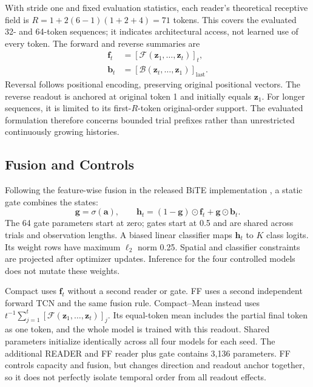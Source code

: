 \documentclass[conference]{IEEEtran}
\begin{document}
With stride one and fixed evaluation statistics, each reader's theoretical
receptive field is $R=1+2(6-1)(1+2+4)=71$ tokens. This covers the evaluated
32- and 64-token sequences; it indicates architectural access, not learned
use of every token. The forward and reverse summaries are
\begin{align}
\mathbf f_t&=[\mathcal F(\mathbf z_1,\ldots,\mathbf z_t)]_t,\\
\mathbf b_t&=[\mathcal B(\mathbf z_t,\ldots,\mathbf z_1)]_{\mathrm{last}}.
\end{align}
Reversal follows positional encoding, preserving original positional vectors.
The reverse readout is anchored at original token 1 and initially equals
$\mathbf z_1$. For longer sequences, it is limited to its first-$R$-token
original-order support. The evaluated formulation therefore concerns bounded
trial prefixes rather than unrestricted continuously growing histories.

\subsection{Fusion and Controls}
Following the feature-wise fusion in the released BiTE implementation
\cite{hong2025bitecode}, a static gate combines the states:
\begin{equation}
\mathbf g=\sigma(\mathbf a),\qquad
\mathbf h_t=(1-\mathbf g)\odot\mathbf f_t+\mathbf g\odot\mathbf b_t.
\end{equation}
The 64 gate parameters start at zero; gates start at 0.5 and are shared across
trials and observation lengths. A biased linear classifier maps $\mathbf h_t$
to $K$ class logits. Its weight rows have maximum $\ell_2$ norm 0.25.
Spatial and classifier constraints are projected after optimizer updates.
Inference for the four controlled models does not mutate these weights.

Compact uses $\mathbf f_t$ without a second reader or gate. FF uses a second
independent forward TCN and the same fusion rule. Compact--Mean instead uses
$t^{-1}\sum_{j=1}^{t}[\mathcal F(\mathbf z_1,\ldots,\mathbf z_t)]_j$.
Its equal-token mean includes the partial final token as one token, and the
whole model is trained with this readout. Shared parameters initialize
identically across all four models for each seed. The additional READER and FF
reader plus gate contains 3,136 parameters. FF controls capacity and fusion,
but changes direction and readout anchor together, so it does not perfectly
isolate temporal order from all readout effects.
\end{document}
